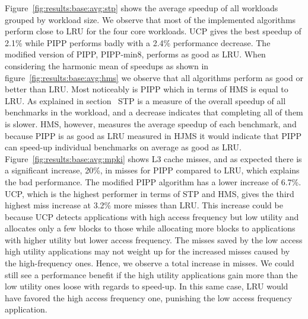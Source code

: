 Figure~\ref{fig:results:base:avg:stp} shows the average speedup of all workloads grouped by workload size.
We observe that most of the implemented algorithms perform close to LRU for the four core workloads.
UCP gives the best speedup of 2.1\% while PIPP performs badly with a 2.4\% performance decrease. 
The modified version of PIPP, PIPP-min8, performs as good as LRU.
When considering the harmonic mean of speedups as shown in figure~\ref{fig:results:base:avg:hms} we observe that all algorithms perform as good or better than LRU.  
Most noticeably is PIPP which in terms of HMS is equal to LRU.
As explained in section~ STP  is a measure of the overall speedup of all benchmarks in the workload, and a decrease indicates that completing all of them is slower.
HMS, however, measures the average speedup of each benchmark, and because PIPP is as good as LRU measured in HJMS it would indicate that PIPP can speed-up individual benchmarks on average as good as LRU.
Figure~\ref{fig:results:base:avg:mpki} shows L3 cache misses, and as expected there is a significant increase, 20\%, in misses for PIPP compared to LRU, which explains the bad performance. 
The modified PIPP algorithm has a lower increase of 6.7\%.
UCP, which is the highest performer in terms of STP and HMS, gives the third highest miss increase at 3.2\% more misses than LRU. 
This increase could be because UCP detects applications with high access frequency but low utility and allocates only a few blocks to those while allocating more blocks to applications with higher utility but lower access frequency.
The misses saved by the low access high utility applications may not weight up for the increased misses caused by the high-frequency ones. 
Hence, we observe a total increase in misses.
We could still see a performance benefit if the high utility applications gain more than the low utility ones loose with regards to speed-up.
In this same case, LRU would have favored the high access frequency one, punishing the low access frequency application.

